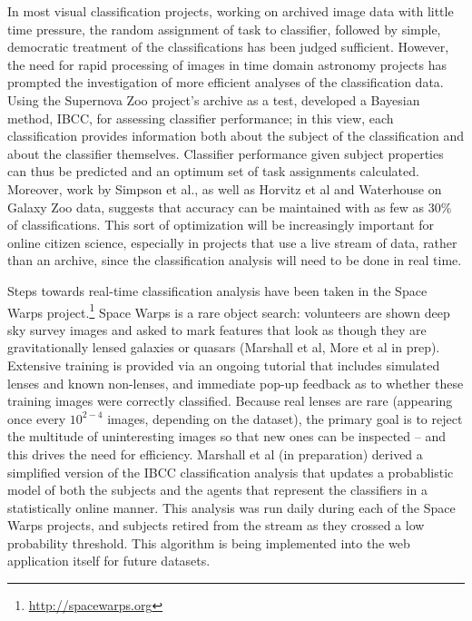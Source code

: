 \documentclass{ar2e}
\begin{document}
In most visual classification projects, working on archived image data with
little time pressure, the random assignment of task to classifier, followed by
simple, democratic treatment of the classifications has been judged sufficient.
However, the need for rapid processing of images in time domain astronomy
projects has prompted the investigation of more efficient analyses of the
classification data.  Using the Supernova Zoo project's archive as a test,
\citet{Simpson++2012IBCC} developed a Bayesian method, IBCC, for assessing
classifier performance; in this view, each classification provides information
both about the subject of the classification and about the classifier
themselves. Classifier performance given subject properties can thus be
predicted and an optimum set of task assignments calculated. 
Moreover, work by Simpson et al., as well as Horvitz et al and Waterhouse on
Galaxy Zoo data, suggests that accuracy can be maintained with as few as 30\% of
classifications. 
This sort of optimization will be increasingly important for online citizen
science, especially in projects that use a live stream of data, rather than
an archive, since the classification analysis will need to be done in real time.



Steps towards real-time classification analysis have been taken in the Space
Warps project.\footnote{\url{http://spacewarps.org}} 
Space Warps is a rare object search: volunteers are shown deep
sky survey images and asked to mark features that look as though they are
gravitationally lensed galaxies or quasars (Marshall et al, More et al in prep).
Extensive training is
provided via an ongoing tutorial that includes simulated lenses and known
non-lenses, and immediate pop-up feedback as to whether these training images
were correctly classified. Because real lenses are rare (appearing once every
$10^{2-4}$ images, depending on the dataset), the primary goal is to reject the
multitude of uninteresting images so that new ones can be inspected -- and this
drives the need for efficiency. Marshall et al (in preparation) derived a
simplified version of the IBCC classification analysis that updates a
probablistic model of both the subjects and the agents that represent the
classifiers in a statistically online manner. This
analysis was run daily during each of the Space Warps projects, and subjects
retired from the stream as they crossed a low probability threshold. This
algorithm is being implemented into the web application itself for future
datasets. 
\end{document}
